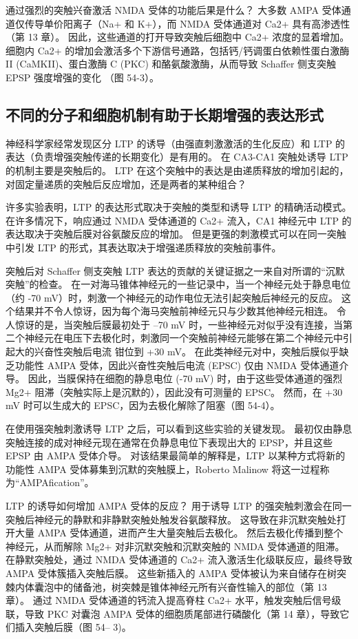 通过强烈的突触兴奋激活 NMDA 受体的功能后果是什么？ 大多数 AMPA 受体通道仅传导单价阳离子（Na+ 和 K+），而 NMDA 受体通道对 Ca2+ 具有高渗透性（第 13 章）。 因此，这些通道的打开导致突触后细胞中 Ca2+ 浓度的显着增加。 细胞内 Ca2+ 的增加会激活多个下游信号通路，包括钙/钙调蛋白依赖性蛋白激酶 II (CaMKII)、蛋白激酶 C (PKC) 和酪氨酸激酶，从而导致 Schaffer 侧支突触 EPSP 强度增强的变化 （图 54-3）。

\subsection{不同的分子和细胞机制有助于长期增强的表达形式}
神经科学家经常发现区分 LTP 的诱导（由强直刺激激活的生化反应）和 LTP 的表达（负责增强突触传递的长期变化）是有用的。 在 CA3-CA1 突触处诱导 LTP 的机制主要是突触后的。 LTP 在这个突触中的表达是由递质释放的增加引起的，对固定量递质的突触后反应增加，还是两者的某种组合？

许多实验表明，LTP 的表达形式取决于突触的类型和诱导 LTP 的精确活动模式。 在许多情况下，响应通过 NMDA 受体通道的 Ca2+ 流入，CA1 神经元中 LTP 的表达取决于突触后膜对谷氨酸反应的增加。 但是更强的刺激模式可以在同一突触中引发 LTP 的形式，其表达取决于增强递质释放的突触前事件。

突触后对 Schaffer 侧支突触 LTP 表达的贡献的关键证据之一来自对所谓的“沉默突触”的检查。 在一对海马锥体神经元的一些记录中，当一个神经元处于静息电位（约 -70 mV）时，刺激一个神经元的动作电位无法引起突触后神经元的反应。 这个结果并不令人惊讶，因为每个海马突触前神经元只与少数其他神经元相连。 令人惊讶的是，当突触后膜最初处于 –70 mV 时，一些神经元对似乎没有连接，当第二个神经元在电压下去极化时，刺激同一个突触前神经元能够在第二个神经元中引起大的兴奋性突触后电流 钳位到 +30 mV。 在此类神经元对中，突触后膜似乎缺乏功能性 AMPA 受体，因此兴奋性突触后电流 (EPSC) 仅由 NMDA 受体通道介导。 因此，当膜保持在细胞的静息电位 (-70 mV) 时，由于这些受体通道的强烈 Mg2+ 阻滞（突触实际上是沉默的），因此没有可测量的 EPSC。 然而，在 +30 mV 时可以生成大的 EPSC，因为去极化解除了阻塞（图 54-4）。

在使用强突触刺激诱导 LTP 之后，可以看到这些实验的关键发现。 最初仅由静息突触连接的成对神经元现在通常在负静息电位下表现出大的 EPSP，并且这些 EPSP 由 AMPA 受体介导。 对该结果最简单的解释是，LTP 以某种方式将新的功能性 AMPA 受体募集到沉默的突触膜上，Roberto Malinow 将这一过程称为“AMPAfication”。

LTP 的诱导如何增加 AMPA 受体的反应？ 用于诱导 LTP 的强突触刺激会在同一突触后神经元的静默和非静默突触处触发谷氨酸释放。 这导致在非沉默突触处打开大量 AMPA 受体通道，进而产生大量突触后去极化。 然后去极化传播到整个神经元，从而解除 Mg2+ 对非沉默突触和沉默突触的 NMDA 受体通道的阻滞。 在静默突触处，通过 NMDA 受体通道的 Ca2+ 流入激活生化级联反应，最终导致 AMPA 受体簇插入突触后膜。 这些新插入的 AMPA 受体被认为来自储存在树突棘内体囊泡中的储备池，树突棘是锥体神经元所有兴奋性输入的部位（第 13 章）。 通过 NMDA 受体通道的钙流入提高脊柱 Ca2+ 水平，触发突触后信号级联，导致 PKC 对囊泡 AMPA 受体的细胞质尾部进行磷酸化（第 14 章），导致它们插入突触后膜（图 54– 3)。

